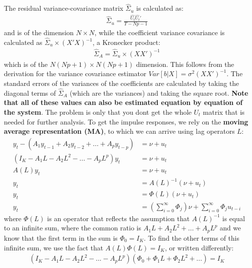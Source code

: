 \documentclass[a4paper, 12pt]{article}
\begin{document}
The residual variance-covariance matrix $\hat{\Sigma}_u$ is calculated as:
\begin{equation}
\begin{aligned}
\hat{\Sigma}_u = \frac{\hat{U_t}\hat{U_t}'}{T-Np-1} \nonumber 
\end{aligned}
\end{equation}
and is of the dimension $N \times N$, while the coefficient variance covariance is calculated as $\hat{\Sigma}_u \times (X'X)^{-1}$, a Kronecker product:
\begin{equation}
\begin{aligned}
\hat{\Sigma}_A = \hat{\Sigma}_u \times (XX')^{-1} \nonumber 
\end{aligned}
\end{equation}
which is of the $N(Np+1) \times N(Np+1)$ dimension. This follows from the derivation for the variance covariance estimator $Var[b|X]=\sigma^2(XX')^{-1}$.
The standard errors of the variances of the coefficients are calculated by taking the diagonal terms of $\hat{\Sigma}_A$ (which are the variances) and taking the square root. 
\textbf{Note that all of these values can also be estimated equation by equation of the system}. The problem is only that you dont get the whole $U_t$ matrix that is needed for further analysis. 
To get the impulse responses, we rely on the \textbf{moving average representation (MA)}, to which we can arrive using lag operators $L$:
\begin{equation}
\begin{aligned}
y_t - (A_1 y_{t-1}+A_2 y_{t-2}+...+A_p y_{t-p})&=\nu + u_t \nonumber \\
(I_K-A_1 L- A_2L^2-...-A_pL^p)y_t&=\nu + u_t \\
A(L)y_t&=\nu+u_t \\
y_t&=A(L)^{-1}(\nu+u_t)\\
y_t&=\Phi(L)(\nu+u_t)\\
y_t&=\left(\sum_{i=0}^\infty\Phi_j\right)\nu+\sum_{i=0}^\infty\Phi_ju_{t-i}
\end{aligned}
\end{equation}
where $\Phi (L)$ is an operator that reflects the assumption that $A(L)^{-1}$ is equal to an infinite sum, where the common ratio is
$A_1 L+A_2L^2+...+A_pL^p$ and we know that the first term in the sum is $\Phi_0=I_K$. To find the other terms of this infinite sum, we use the fact that
$A(L)\Phi(L)=I_K$, or written differently:
\begin{equation}
\begin{aligned}
(I_K-A_1 L- A_2L^2-...-A_pL^p)(\Phi_0+\Phi_1L+\Phi_2L^2+...)=I_K \nonumber
\end{aligned}
\end{equation} 
\end{document}
